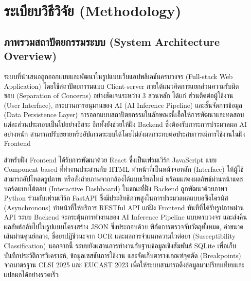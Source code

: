 \chapter{ระเบียบวิธีวิจัย (Methodology)}

\section{ภาพรวมสถาปัตยกรรมระบบ (System Architecture Overview)}

ระบบที่นำเสนอถูกออกแบบและพัฒนาในรูปแบบเว็บแอปพลิเคชันครบวงจร (Full-stack Web Application) โดยใช้สถาปัตยกรรมแบบ Client-server ภายใต้แนวคิดการแยกส่วนความรับผิดชอบ (Separation of Concerns) อย่างชัดเจนระหว่าง 3 ส่วนหลัก ได้แก่ ส่วนติดต่อผู้ใช้งาน (User Interface), กระบวนการอนุมานของ AI (AI Inference Pipeline) และชั้นจัดการข้อมูล (Data Persistence Layer) การออกแบบสถาปัตยกรรมในลักษณะนี้เอื้อให้การพัฒนาและทดสอบแต่ละส่วนประกอบเป็นไปอย่างอิสระ อีกทั้งยังช่วยให้ฝั่ง Backend ซึ่งต้องรับภาระการประมวลผล AI อย่างหนัก สามารถปรับขยายหรืออัปเกรดระบบได้โดยไม่ส่งผลกระทบต่อประสบการณ์การใช้งานในฝั่ง Frontend

สำหรับฝั่ง Frontend ได้รับการพัฒนาด้วย React ซึ่งเป็นเฟรมเวิร์ก JavaScript แบบ Component-based ที่ทำงานประสานกับ HTML \cite{sharma2018html,mozilla2025html} ทำหน้าที่เป็นหน้าจอหลัก (Interface) ให้ผู้ใช้สามารถอัปโหลดรูปภาพ หรือสั่งถ่ายภาพจากกล้องได้แบบเรียลไทม์ พร้อมแสดงผลลัพธ์ผ่านหน้าแดชบอร์ดแบบโต้ตอบ (Interactive Dashboard) ในขณะที่ฝั่ง Backend ถูกพัฒนาด้วยภาษา Python \cite{siva2023python} ร่วมกับเฟรมเวิร์ก FastAPI \cite{tioman2024fastapi} ซึ่งมีประสิทธิภาพสูงในการประมวลผลแบบอซิงโครนัส (Asynchronous) ทำหน้าที่ให้บริการ RESTful API แก่ฝั่ง Frontend 
ทันทีที่ได้รับรูปภาพผ่าน API ระบบ Backend จะกระตุ้นการทำงานของ AI Inference Pipeline แบบครบวงจร และส่งคืนผลลัพธ์กลับไปในรูปแบบโครงสร้าง JSON ซึ่งประกอบด้วย พิกัดการตรวจจับวัตถุทั้งหมด, ค่าขนาดเส้นผ่านศูนย์กลาง, ชื่อยาปฏิชีวนะจาก OCR และผลการจำแนกความไวต่อยา (Susceptibility Classification) นอกจากนี้ ระบบยังผสานการทำงานกับฐานข้อมูลเชิงสัมพันธ์ SQLite \cite{sqlite} เพื่อเก็บบันทึกประวัติการวิเคราะห์, ข้อมูลเซสชันการใช้งาน และจัดเก็บตารางเกณฑ์จุดตัด (Breakpoints) จากมาตรฐาน CLSI 2025 และ EUCAST 2023 เพื่อให้ระบบสามารถดึงข้อมูลมาเปรียบเทียบและแปลผลได้อย่างรวดเร็ว

